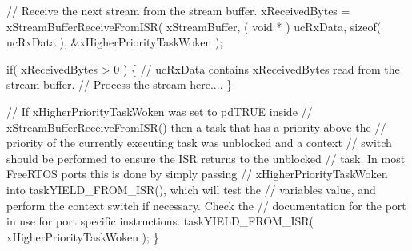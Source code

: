 \begin{DoxyPre}    // Receive the next stream from the stream buffer.
    xReceivedBytes = xStreamBufferReceiveFromISR( xStreamBuffer,
                                                  ( void * ) ucRxData,
                                                  sizeof( ucRxData ),
                                                  \&xHigherPriorityTaskWoken );\end{DoxyPre}



\begin{DoxyPre}    if( xReceivedBytes > 0 )
    \{
        // ucRxData contains xReceivedBytes read from the stream buffer.
        // Process the stream here....
    \}\end{DoxyPre}



\begin{DoxyPre}    // If xHigherPriorityTaskWoken was set to pdTRUE inside
    // xStreamBufferReceiveFromISR() then a task that has a priority above the
    // priority of the currently executing task was unblocked and a context
    // switch should be performed to ensure the ISR returns to the unblocked
    // task.  In most FreeRTOS ports this is done by simply passing
    // xHigherPriorityTaskWoken into taskYIELD\_FROM\_ISR(), which will test the
    // variables value, and perform the context switch if necessary.  Check the
    // documentation for the port in use for port specific instructions.
    taskYIELD\_FROM\_ISR( xHigherPriorityTaskWoken );
\}
\end{DoxyPre}
 